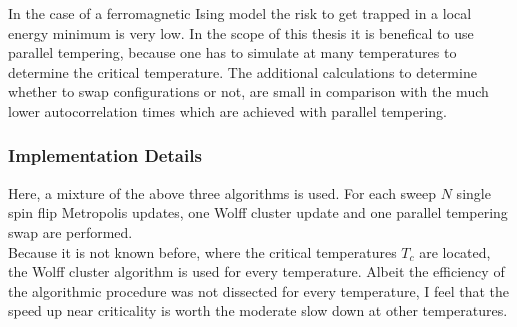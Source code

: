         In the case of a ferromagnetic Ising model the risk to get trapped
        in a local energy minimum is very low. In the scope of this thesis it is benefical
        to use parallel tempering, because one has to simulate at many temperatures
        to determine the critical temperature. The additional calculations
        to determine whether to swap configurations or not, are small in
        comparison with the much lower autocorrelation times which are
        achieved with parallel tempering.

    \subsubsection{Implementation Details}
        Here, a mixture of the above three algorithms is used.
        For each sweep \(N\) single spin flip Metropolis updates, one
        Wolff cluster update and one parallel tempering swap are
        performed.\\
        Because it is not known before, where the critical temperatures
        \(T_c\) are located, the Wolff cluster algorithm is used for
        every temperature. Albeit the efficiency of the algorithmic procedure
        was not dissected for every temperature, I feel that the speed up
        near criticality is worth the moderate slow down at other temperatures.
